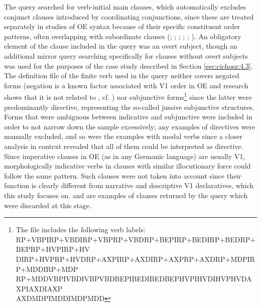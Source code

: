 \documentclass[output=paper,colorlinks,citecolor=brown]{langscibook}
\begin{document}
The query searched for verb-initial main clauses, which automatically excludes conjunct clauses introduced by coordinating conjunctions, since these are treated separately in studies of OE syntax because of their specific constituent order patterns, often overlapping with subordinate clauses (\citealt{Mitchell1985}; \citealt{vanKemenade1987}; \citealt{Pintzuk1999}; \citealt{FischerEtAl2000}; \citealt{RingeTaylor2014}; \citealt{Cichosz2022}). An obligatory element of the clause included in the query was an overt subject, though an additional mirror query searching specifically for clauses without overt subjects was used for the purposes of the case study described in Section \ref{sec:cichosz:4.3}. The definition file of the finite verb used in the query neither covers negated forms (negation is a known factor associated with V1 order in OE and research shows that it is not related to , cf. \citealt{Cichosz2020}) nor subjunctive forms\footnote{ {The file includes the following verb labels: \\ RP+VBPI{\textbar}RP+VBDI{\textbar}RP+VBP{\textbar}RP+VBD{\textbar}RP+BEPI{\textbar}RP+BEDI{\textbar}RP+BED{\textbar}RP+BEP{\textbar}RP+HVPI{\textbar}RP+HV\\
DI{\textbar}RP+HVP{\textbar}RP+HVD{\textbar}RP+AXPI{\textbar}RP+AXDI{\textbar}RP+AXP{\textbar}RP+AXD{\textbar}RP+MDPI{\textbar}RP+MDDI{\textbar}RP+MDP{\textbar}\\
RP+MDD{\textbar}VBPI{\textbar}VBDI{\textbar}VBP{\textbar}VBD{\textbar}BEPI{\textbar}BEDI{\textbar}BED{\textbar}BEP{\textbar}HVPI{\textbar}HVDI{\textbar}HVP{\textbar}HVD{\textbar}AXPI{\textbar}AXDI{\textbar}AXP\\{\textbar}AXD{\textbar}MDPI{\textbar}MDDI{\textbar}MDP{\textbar}MDD}} since the latter were predominantly directive, representing the so-called jussive subjunctive structures. Forms that were ambiguous between indicative and subjunctive were included in order to not narrow down the sample excessively; any examples of directives were manually excluded, and so were the examples with modal verbs since a closer analysis in context revealed that all of them could be interpreted as directive. Since imperative clauses in OE (as in any Germanic language) are usually V1, morphologically indicative verbs in clauses with similar illocutionary force could follow the same pattern. Such clauses were not taken into account since their function is clearly different from narrative and descriptive V1 declaratives, which this study focuses on.  and  are examples of clauses returned by the query which were discarded at this stage.
\end{document}
